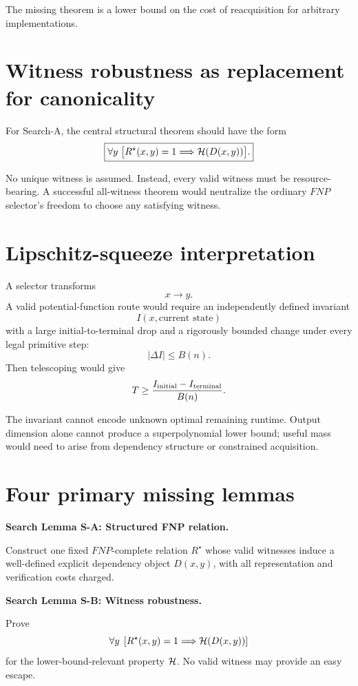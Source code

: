 \documentclass[11pt]{article}
\begin{document}
The missing theorem is a lower bound on the cost of reacquisition for arbitrary implementations.

\section{Witness robustness as replacement for canonicality}

For Search-A, the central structural theorem should have the form
\[
\boxed{
\forall y\;
\bigl[R^\star(x,y)=1
\Longrightarrow
{\cal H}(D(x,y))\bigr].
}
\]

No unique witness is assumed. Instead, every valid witness must be resource-bearing. A successful
all-witness theorem would neutralize the ordinary \(FNP\) selector's freedom to choose any satisfying
witness.

\section{Lipschitz-squeeze interpretation}

A selector transforms
\[
x\longrightarrow y.
\]
A valid potential-function route would require an independently defined invariant
\[
I(x,\text{current state})
\]
with a large initial-to-terminal drop and a rigorously bounded change under every legal primitive
step:
\[
|\Delta I|\le B(n).
\]
Then telescoping would give
\[
T\ge
\frac{I_{\rm initial}-I_{\rm terminal}}{B(n)}.
\]

The invariant cannot encode unknown optimal remaining runtime. Output dimension alone cannot produce
a superpolynomial lower bound; useful mass would need to arise from dependency structure or constrained
acquisition.

\section{Four primary missing lemmas}

\begin{candidatebox}
\textbf{Search Lemma S-A: Structured FNP relation.}

Construct one fixed \(FNP\)-complete relation \(R^\star\) whose valid witnesses induce a well-defined
explicit dependency object \(D(x,y)\), with all representation and verification costs charged.
\end{candidatebox}

\begin{candidatebox}
\textbf{Search Lemma S-B: Witness robustness.}

Prove
\[
\forall y\;
\left[
R^\star(x,y)=1
\Longrightarrow
{\cal H}(D(x,y))
\right]
\]
for the lower-bound-relevant property \({\cal H}\). No valid witness may provide an easy escape.
\end{candidatebox}
\end{document}
